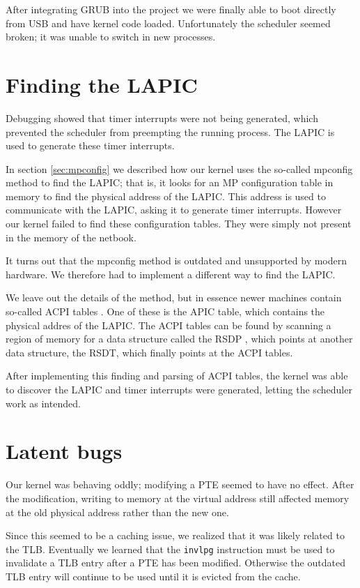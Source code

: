 \documentclass{report}
\begin{document}
After integrating GRUB into the project we were finally able to boot directly
from USB and have kernel code loaded. Unfortunately the scheduler seemed
broken; it was unable to switch in new processes.



\section{Finding the LAPIC}
Debugging showed that timer interrupts were not being generated, which
prevented the scheduler from preempting the running process. The LAPIC is
used to generate these timer interrupts.

In section \ref{sec:mpconfig} we described how our kernel uses the so-called
mpconfig method to find the LAPIC; that is, it looks for an MP
configuration table in memory to find the physical address of the LAPIC. This
address is used to communicate with the LAPIC, asking it to generate timer
interrupts. However our kernel failed to find these configuration tables. They
were simply not present in the memory of the netbook.

It turns out that the mpconfig method is outdated and unsupported by
modern hardware. We therefore had to implement a different way to find the
LAPIC.

We leave out the details of the method, but in essence newer machines contain
so-called ACPI tables \cite{symm}. One of these is the APIC table, which
contains the physical addres of the LAPIC. The ACPI tables can be found by
scanning a region of memory for a data structure called the RSDP \cite{rsdp},
which points at another data structure, the RSDT, which finally points at the
ACPI tables.

After implementing this finding and parsing of ACPI tables, the kernel was
able to discover the LAPIC and timer interrupts were generated, letting the
scheduler work as intended.


\section{Latent bugs}
Our kernel was behaving oddly; modifying a PTE seemed to have no effect.
After the modification, writing to memory at the virtual address still
affected memory at the old physical address rather than the new one.

Since this seemed to be a caching issue, we realized that it was likely
related to the TLB. Eventually we learned that the \texttt{invlpg}
instruction must be used to invalidate a TLB entry after a PTE has
been modified. Otherwise the outdated TLB entry will continue to be used
until it is evicted from the cache.
\end{document}
